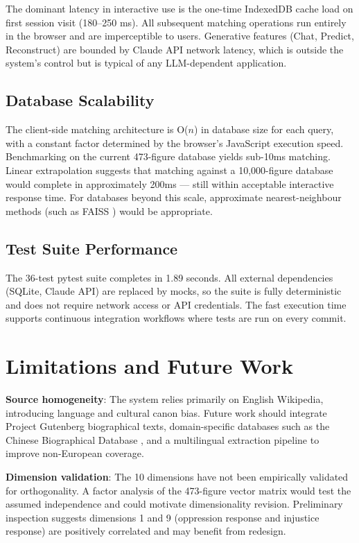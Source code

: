 \documentclass[11pt, a4paper]{report}
\begin{document}
The dominant latency in interactive use is the one-time IndexedDB cache load on first session visit (180--250 ms). All subsequent matching operations run entirely in the browser and are imperceptible to users. Generative features (Chat, Predict, Reconstruct) are bounded by Claude API network latency, which is outside the system's control but is typical of any LLM-dependent application.

\subsection{Database Scalability}

The client-side matching architecture is O($n$) in database size for each query, with a constant factor determined by the browser's JavaScript execution speed. Benchmarking on the current 473-figure database yields sub-10ms matching. Linear extrapolation suggests that matching against a 10,000-figure database would complete in approximately 200ms — still within acceptable interactive response time. For databases beyond this scale, approximate nearest-neighbour methods (such as FAISS \citep{johnson2019}) would be appropriate.

\subsection{Test Suite Performance}

The 36-test pytest suite completes in 1.89 seconds. All external dependencies (SQLite, Claude API) are replaced by mocks, so the suite is fully deterministic and does not require network access or API credentials. The fast execution time supports continuous integration workflows where tests are run on every commit.

\section{Limitations and Future Work}

\textbf{Source homogeneity}: The system relies primarily on English Wikipedia, introducing language and cultural canon bias. Future work should integrate Project Gutenberg biographical texts, domain-specific databases such as the Chinese Biographical Database \citep{hartwell1986}, and a multilingual extraction pipeline to improve non-European coverage.

\textbf{Dimension validation}: The 10 dimensions have not been empirically validated for orthogonality. A factor analysis of the 473-figure vector matrix would test the assumed independence and could motivate dimensionality revision. Preliminary inspection suggests dimensions 1 and 9 (oppression response and injustice response) are positively correlated and may benefit from redesign.
\end{document}
